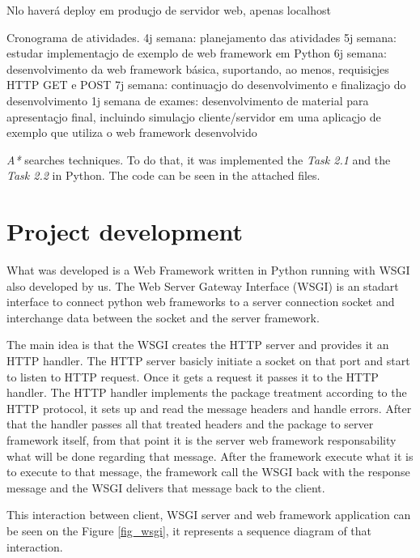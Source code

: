 \documentclass[journal,12pt,onecolumn,draftclsnofoot,]{IEEEtran}
\begin{document}
Nlo haverá deploy em produçjo de servidor web, apenas localhost

Cronograma de atividades.
4j semana: planejamento das atividades
5j semana: estudar implementaçjo de exemplo de web framework em Python
6j semana: desenvolvimento da web framework básica, suportando, ao menos, requisiçjes HTTP GET e POST
7j semana: continuaçjo do desenvolvimento e finalizaçjo do desenvolvimento
1j semana de exames: desenvolvimento de material para apresentaçjo final, incluindo simulaçjo cliente/servidor em uma aplicaçjo de exemplo que utiliza o web framework desenvolvido


 \textit{A*} searches techniques. To do that, it was implemented the \textit{Task 2.1} and the \textit{Task 2.2} in Python. The code can be seen in the attached files.

\section{Project development}
What was developed is a Web Framework written in Python running with WSGI also developed by us. The Web Server Gateway Interface (WSGI) is an stadart interface to connect python web frameworks to a server connection socket and interchange data between the socket and the server framework.

The main idea is that the WSGI creates the HTTP server and provides it an HTTP handler. The HTTP server basicly initiate a socket on that port and start to listen to HTTP request. Once it gets a request it passes it to the HTTP handler. The HTTP handler implements the package treatment according to the HTTP protocol, it sets up and read the message headers and handle errors. After that the handler passes all that treated headers and the package to server framework itself, from that point it is the server web framework responsability what will be done regarding that message. After the framework execute what it is to execute to that message, the framework call the WSGI back with the response message and the WSGI delivers that message back to the client.

This interaction between client, WSGI server and web framework application can be seen on the Figure \ref{fig_wsgi}, it represents a sequence diagram of that interaction.
\end{document}
